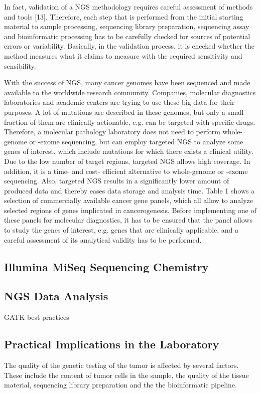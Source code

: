In fact, validation of a NGS methodology requires careful assessment of methods
and tools [13]. Therefore, each step that is performed from the initial starting
material to sample processing, sequencing library preparation, sequencing assay
and bioinformatic processing has to be carefully checked for sources of
potential errors or variability. Basically, in the validation process, it is
checked whether the method measures what it claims to measure with the required
sensitivity and sensibility.

With the success of NGS, many cancer genomes have been sequenced and made
available to the worldwide research community. Companies, molecular diagnostics
laboratories and academic centers are trying to use these big data for their
purposes. A lot of mutations are described in these genomes, but only a small
fraction of them are clinically actionable, e.g. can be targeted with specific
drugs. Therefore, a molecular pathology laboratory does not need to perform
whole-genome or -exome sequencing, but can employ targeted NGS to analyze some
genes of interest, which include mutations for which there exists a clinical
utility. Due to the low number of target regions, targeted NGS allows high
coverage. In addition, it is a time- and cost- efficient alternative to
whole-genome or -exome sequencing. Also, targeted NGS results in a significantly
lower amount of produced data and thereby eases data storage and analysis time.
Table 1 shows a selection of commercially available cancer gene panels, which
all allow to analyze selected regions of genes implicated in cancerogenesis.
Before implementing one of these panels for molecular diagnostics, it has to be
ensured that the panel allows to study the genes of interest, e.g. genes that
are clinically applicable, and a careful assessment of its analytical validity
has to be performed.

\subsection{Illumina MiSeq Sequencing Chemistry}

\subsection{NGS Data Analysis}

GATK best practices

\subsection{Practical Implications in the Laboratory}
The quality of the genetic testing of the tumor is affected by several
factors. These include the content of tumor cells in the sample, the quality
of the tissue material, sequencing library preparation and the the
bioinformatic pipeline.

